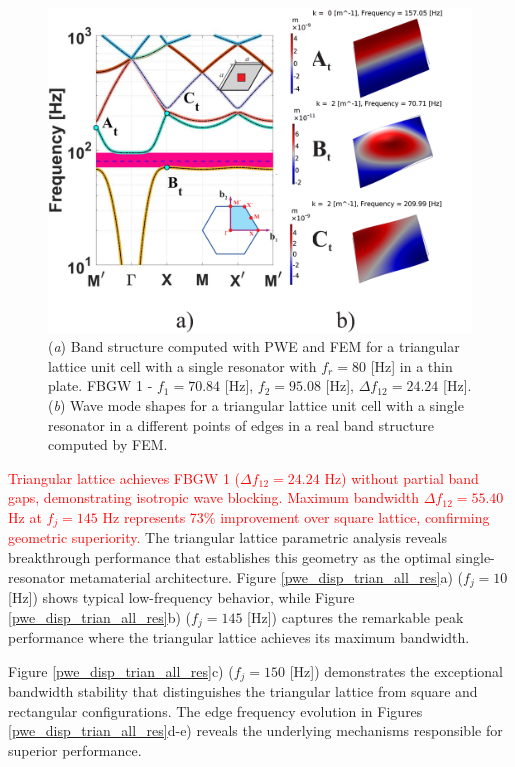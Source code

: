 \documentclass[review,numbers,sort&compress]{elsarticle}
\begin{document}
\newpage
\begin{figure}[htb]
	\centering
	\includegraphics[width=.8\textwidth]{1_3_disp_frf_trian.pdf}
	\caption{(\textit{a}) Band structure computed with PWE and FEM for a triangular lattice unit cell with a single resonator with $f_r = 80$ [Hz] in a thin plate. FBGW 1 - $f_1 = 70.84$ [Hz], $f_2 = 95.08$ [Hz], $\Delta f_{12} = 24.24 $ [Hz]. (\textit{b}) Wave mode shapes for a triangular lattice unit cell with a single resonator in a different points of edges in a real band structure computed by FEM.}
	\label{pwe_fem_disp_modal_trian}
    \end{figure}

\textcolor{red}{Triangular lattice achieves FBGW 1 ($\Delta f_{12} = 24.24$ Hz) without partial band gaps, demonstrating isotropic wave blocking. Maximum bandwidth $\Delta f_{12} = 55.40$ Hz at $f_j = 145$ Hz represents 73\% improvement over square lattice, confirming geometric superiority.} The triangular lattice parametric analysis reveals breakthrough performance that establishes this geometry as the optimal single-resonator metamaterial architecture. Figure \ref{pwe_disp_trian_all_res}a) ($f_j = 10$ [Hz]) shows typical low-frequency behavior, while Figure \ref{pwe_disp_trian_all_res}b) ($f_j = 145$ [Hz]) captures the remarkable peak performance where the triangular lattice achieves its maximum bandwidth.

Figure \ref{pwe_disp_trian_all_res}c) ($f_j = 150$ [Hz]) demonstrates the exceptional bandwidth stability that distinguishes the triangular lattice from square and rectangular configurations. The edge frequency evolution in Figures \ref{pwe_disp_trian_all_res}d-e) reveals the underlying mechanisms responsible for superior performance.
\end{document}
